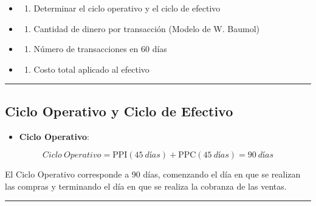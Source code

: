 \documentclass[
  letterpaper,
  DIV=11,
  numbers=noendperiod]{scrartcl}
\providecommand{\tightlist}{%
  \setlength{\itemsep}{0pt}\setlength{\parskip}{0pt}}\usepackage{longtable,booktabs,array}
\begin{document}
\begin{itemize}
\tightlist
\item
  \begin{enumerate}
  \def\labelenumi{\alph{enumi})}
  \tightlist
  \item
    Determinar el ciclo operativo y el ciclo de efectivo
  \end{enumerate}
\item
  \begin{enumerate}
  \def\labelenumi{\alph{enumi})}
  \setcounter{enumi}{1}
  \tightlist
  \item
    Cantidad de dinero por transacción (Modelo de W. Baumol)
  \end{enumerate}
\item
  \begin{enumerate}
  \def\labelenumi{\alph{enumi})}
  \setcounter{enumi}{2}
  \tightlist
  \item
    Número de transacciones en 60 días
  \end{enumerate}
\item
  \begin{enumerate}
  \def\labelenumi{\alph{enumi})}
  \setcounter{enumi}{3}
  \tightlist
  \item
    Costo total aplicado al efectivo
  \end{enumerate}
\end{itemize}

\begin{center}\rule{0.5\linewidth}{0.5pt}\end{center}

\subsection{Ciclo Operativo y Ciclo de
Efectivo}\label{ciclo-operativo-y-ciclo-de-efectivo}

\begin{itemize}
\tightlist
\item
  \textbf{Ciclo Operativo}:
\end{itemize}

\[
Ciclo\ Operativo = \text{PPI} (45\ días) + \text{PPC} (45\ días) = 90\ días
\]

El Ciclo Operativo corresponde a 90 días, comenzando el día en que se
realizan las compras y terminando el día en que se realiza la cobranza
de las ventas.

\begin{center}\rule{0.5\linewidth}{0.5pt}\end{center}
\end{document}
